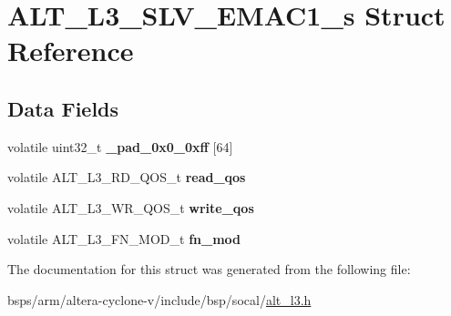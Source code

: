 \hypertarget{structALT__L3__SLV__EMAC1__s}{}\section{A\+L\+T\+\_\+\+L3\+\_\+\+S\+L\+V\+\_\+\+E\+M\+A\+C1\+\_\+s Struct Reference}
\label{structALT__L3__SLV__EMAC1__s}
\subsection*{Data Fields}
\begin{DoxyCompactItemize}
\item 
\mbox{\label{structALT__L3__SLV__EMAC1__s_a084278c1e6c12229151e8ea9ccadb16c}} 
volatile uint32\+\_\+t {\bfseries \+\_\+pad\+\_\+0x0\+\_\+0xff} \mbox{[}64\mbox{]}
\item 
\mbox{\label{structALT__L3__SLV__EMAC1__s_a0246f7abec0aa0b045234d3778bdd4df}} 
volatile A\+L\+T\+\_\+\+L3\+\_\+\+R\+D\+\_\+\+Q\+O\+S\+\_\+t {\bfseries read\+\_\+qos}
\item 
\mbox{\label{structALT__L3__SLV__EMAC1__s_a17db32f8bf3e045c40edbd9ba8514fd9}} 
volatile A\+L\+T\+\_\+\+L3\+\_\+\+W\+R\+\_\+\+Q\+O\+S\+\_\+t {\bfseries write\+\_\+qos}
\item 
\mbox{\label{structALT__L3__SLV__EMAC1__s_a0d0eb3960c9a666590083d2348b13148}} 
volatile A\+L\+T\+\_\+\+L3\+\_\+\+F\+N\+\_\+\+M\+O\+D\+\_\+t {\bfseries fn\+\_\+mod}
\end{DoxyCompactItemize}


The documentation for this struct was generated from the following file\+:\begin{DoxyCompactItemize}
\item 
bsps/arm/altera-\/cyclone-\/v/include/bsp/socal/\mbox{\hyperlink{alt__l3_8h}{alt\+\_\+l3.\+h}}\end{DoxyCompactItemize}
